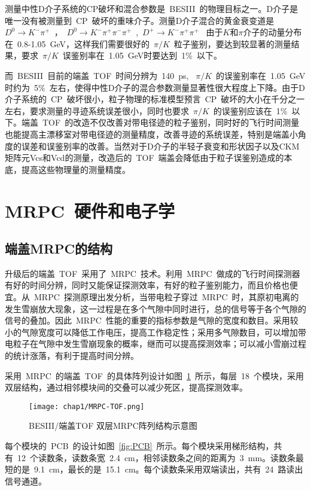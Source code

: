 测量中性D介子系统的CP破坏和混合参数是~BESIII~的物理目标之一。D介子是唯一没有被测量到~CP~破坏的重味介子。测量D介子混合的黄金衰变道是~$D^0 \to K^- \pi^+$~，~$D^0 \to K^- \pi^+\pi^-\pi^+$~,~$D^+ \to K^- \pi^+\pi^+$~
由于$K$和$\pi$介子的动量分布在~0.8-1.05~GeV，这样我们需要很好的~$\pi/K$~粒子鉴别，要达到较显著的测量结果，要求~$\pi/K$~误鉴别率在~1.05~GeV时要达到~1$\%$~以下。

而~BESIII~目前的端盖~TOF~时间分辨为~140~ps, ~$\pi/K$~的误鉴别率在~1.05~GeV时约为~5$\%$~左右，使得中性D介子的混合参数测量显著性很大程度上下降。由于D介子系统的~CP~破坏很小，粒子物理的标准模型预言~CP~破坏的大小在千分之一左右，要求测量的寻迹系统误差很小，同时也要求~$\pi/K$~的误鉴别应该在~1$\%$~以下。端盖~TOF~的改造不仅改善对带电径迹的粒子鉴别，同时好的飞行时间测量也能提高主漂移室对带电径迹的测量精度，改善寻迹的系统误差，特别是端盖小角度的误差和误鉴别率的改善。当然对于D介子的半轻子衰变和形状因子以及CKM矩阵元Vcs和Vcd的测量，改造后的~TOF~端盖会降低由于粒子误鉴别造成的本底，提高这些物理量的测量精度。 

\section{MRPC~硬件和电子学}
\subsection{端盖MRPC的结构}
升级后的端盖~TOF~采用了~MRPC~技术。利用~MRPC~做成的飞行时间探测器有好的时间分辨，同时又能保证探测效率，有好的粒子鉴别能力，而且价格也便宜。从~MRPC~探测原理出发分析，当带电粒子穿过~MRPC~时，其原初电离的发生雪崩放大现象，这一过程是在多个气隙中同时进行，总的信号等于各个气隙的信号的叠加。因此~MRPC~性能的重要的指标参数是气隙的宽度和数目。采用较小的气隙宽度可以降低工作电压，提高工作稳定性；采用多气隙数目，可以增加带电粒子在气隙中发生雪崩现象的概率，继而可以提高探测效率；可以减小雪崩过程的统计涨落，有利于提高时间分辨。

采用~MRPC~的端盖~TOF~的具体阵列设计如图~\ref{fig:MRPC-TOF}~所示，每层~18~个模块，采用双层结构，通过相邻模块间的交叠可以减少死区，提高探测效率。
\begin{figure}[!h]
  \centering
  \texttt{[image: chap1/MRPC-TOF.png]}
  \caption{BESIII/端盖TOF 双层MRPC阵列结构示意图}
  \label{fig:MRPC-TOF}
\end{figure}

每个模块的~PCB~的设计如图~\ref{fig:PCB}~所示。每个模块采用梯形结构，共有~12~个读数条，读数条宽~2.4~cm，相邻读数条之间的距离为~3~mm。读数条最短的是~9.1~cm，最长的是~15.1~cm。每个读数条采用双端读出，共有~24~路读出信号通道。

